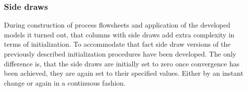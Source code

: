     \subsubsection{Side draws}
        During construction of process flowsheets and application of the developed models it turned
        out, that columns with side draws add extra complexity in terms of initialization. To accommodate that
        fact side draw versions of the previously described initialization procedures have been developed.
        The only difference is, that the side draws are initially set to zero once convergence has been
        achieved, they are again set to their specified values. Either by an instant change or again
        in a continuous fashion.
